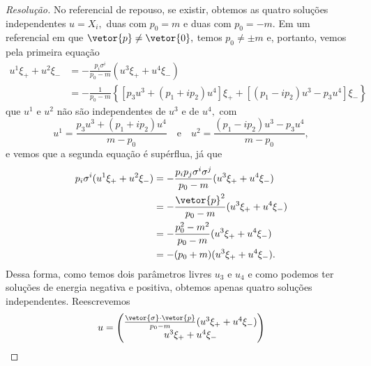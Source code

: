 \begin{proof}[Resolução]
    No referencial de repouso, se existir, obtemos as quatro soluções independentes \(u = X_i,\) duas com \(p_0 = m\) e duas com \(p_0 = -m.\) Em um referencial em que \(\vetor{p} \neq \vetor{0},\) temos \(p_0 \neq \pm m\)  e, portanto, vemos pela primeira equação
    \begin{align*}
        u^1 \xi_+ + u^2 \xi_- &= -\frac{p_i\sigma^i}{p_0 - m} (u^3 \xi_+ + u^4 \xi_-)\\
                              &= -\frac{1}{p_0 - m} \left\{\left[p_3 u^3 + (p_1 + i p_2)u^4\right]\xi_+ + \left[(p_1 - i p_2) u^3 - p_3 u^4\right]\xi_-\right\}
    \end{align*}
    que \(u^1\) e \(u^2\) não são independentes de \(u^3\) e de \(u^4,\) com
    \begin{equation*}
        u^1 = \frac{p_3 u^3 + (p_1 + i p_2) u^4}{m - p_0}
        \quad\text{e}\quad
        u^2 = \frac{(p_1 - ip_2) u^3 - p_3 u^4}{m - p_0},
    \end{equation*}
    e vemos que a segunda equação é supérflua, já que
    \begin{align*}
        p_i \sigma^i (u^1 \xi_+ + u^2 \xi_-) &= - \frac{p_i p_j \sigma^i \sigma^j}{p_0 - m} (u^3 \xi_+ + u^4 \xi_-)\\
                                             &= -\frac{\vetor{p}^2}{p_0 - m} (u^3 \xi_+ + u^4 \xi_-)\\
                                             &= - \frac{p_0^2 - m^2}{p_0 - m} (u^3 \xi_+ + u^4 \xi_-)\\
                                             &= - (p_0 + m) (u^3 \xi_+ + u^4 \xi_-).
    \end{align*}
    Dessa forma, como temos dois parâmetros livres \(u_3\) e \(u_4\) e como podemos ter soluções de energia negativa e positiva, obtemos apenas quatro soluções independentes. Reescrevemos
    \begin{equation*}
        u = \begin{pmatrix}
            \frac{\vetor{\sigma}\cdot\vetor{p}}{p_0 - m} (u^3\xi_+ + u^4 \xi_-)\\
            u^3\xi_+ + u^4 \xi_-
        \end{pmatrix}
    \end{equation*}
\end{proof}
